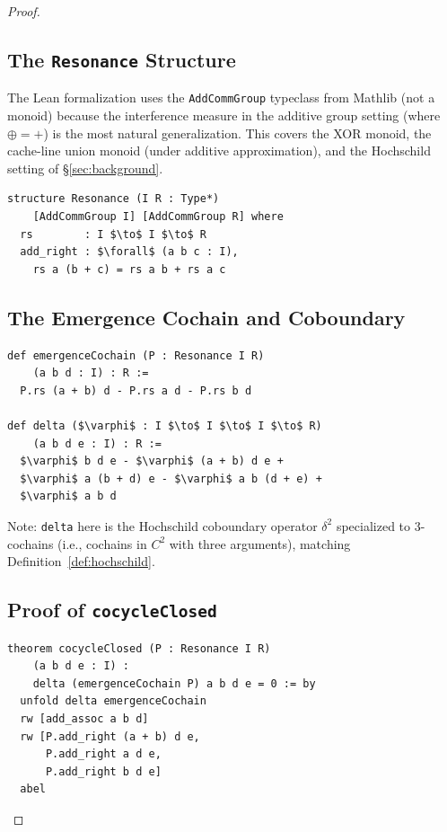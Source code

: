 \documentclass[acmsmall,sigplan,anonymous,review,screen]{acmart}
\theoremstyle{plain}
\theoremstyle{definition}
\newcommand{\lean}[1]{\texttt{#1}}
\begin{document}
\begin{proof}
\subsection{The \texttt{Resonance} Structure}
\label{sec:lean:resonance}

The Lean formalization uses the \lean{AddCommGroup} typeclass from Mathlib
(not a monoid) because the interference measure in the additive group
setting (where $\oplus = +$) is the most natural generalization.  This
covers the XOR monoid, the cache-line union monoid (under additive
approximation), and the Hochschild setting of \S\ref{sec:background}.

\begin{lstlisting}[frame=single]
structure Resonance (I R : Type*)
    [AddCommGroup I] [AddCommGroup R] where
  rs        : I $\to$ I $\to$ R
  add_right : $\forall$ (a b c : I),
    rs a (b + c) = rs a b + rs a c
\end{lstlisting}

\subsection{The Emergence Cochain and Coboundary}
\label{sec:lean:cochain}

\begin{lstlisting}[frame=single]
def emergenceCochain (P : Resonance I R)
    (a b d : I) : R :=
  P.rs (a + b) d - P.rs a d - P.rs b d

def delta ($\varphi$ : I $\to$ I $\to$ I $\to$ R)
    (a b d e : I) : R :=
  $\varphi$ b d e - $\varphi$ (a + b) d e +
  $\varphi$ a (b + d) e - $\varphi$ a b (d + e) +
  $\varphi$ a b d
\end{lstlisting}

Note: \lean{delta} here is the Hochschild coboundary operator $\delta^2$
specialized to 3-cochains (i.e., cochains in $C^2$ with three arguments),
matching Definition~\ref{def:hochschild}.

\subsection{Proof of \texttt{cocycleClosed}}
\label{sec:lean:proof}

\begin{lstlisting}[frame=single]
theorem cocycleClosed (P : Resonance I R)
    (a b d e : I) :
    delta (emergenceCochain P) a b d e = 0 := by
  unfold delta emergenceCochain
  rw [add_assoc a b d]
  rw [P.add_right (a + b) d e,
      P.add_right a d e,
      P.add_right b d e]
  abel
\end{lstlisting}


\end{proof}
\end{document}
